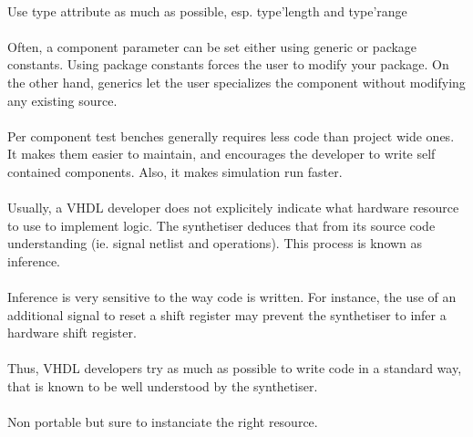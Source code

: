 \documentclass[12pt]{article}
\begin{document}
\paragraph{}
Use type attribute as much as possible, esp. type'length
and type'range


\paragraph{}
Often, a component parameter can be set either using
generic or package constants. Using package constants
forces the user to modify your package. On the other
hand, generics let the user specializes the component
without modifying any existing source.


\paragraph{}
Per component test benches generally requires less code than
project wide ones. It makes them easier to maintain, and
encourages the developer to write self contained components.
Also, it makes simulation run faster.


\paragraph{}
Usually, a VHDL developer does not explicitely indicate what
hardware resource to use to implement logic. The synthetiser
deduces that from its source code understanding (ie. signal
netlist and operations). This process is known as inference.
\paragraph{}
Inference is very sensitive to the way code is written. For
instance, the use of an additional signal to reset a shift
register may prevent the synthetiser to infer a hardware
shift register.
\paragraph{}
Thus, VHDL developers try as much as possible to write code
in a standard way, that is known to be well understood by the
synthetiser.


\paragraph{}
Non portable but sure to instanciate the right resource.
\end{document}
